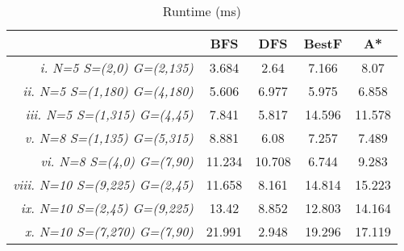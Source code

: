 \begin{table}[ht]
\centering
\begin{tabular}{r|c|c|c|c|}
\cline{2-5}
\multicolumn{1}{l|}{} & \textbf{BFS} & \textbf{DFS} & \textbf{BestF} & \textbf{A*} \\ \hline
\multicolumn{1}{|r|}{\textit{i. N=5 S=(2,0) G=(2,135)}} & 3.684 & 2.64 & 7.166 & 8.07 \\ \hline
\multicolumn{1}{|r|}{\textit{ii. N=5 S=(1,180) G=(4,180)}} & 5.606 & 6.977 & 5.975 & 6.858 \\ \hline
\multicolumn{1}{|r|}{\textit{iii. N=5 S=(1,315) G=(4,45)}} & 7.841 & 5.817 & 14.596 & 11.578 \\ \hline
\multicolumn{1}{|r|}{\textit{v. N=8 S=(1,135) G=(5,315)}} & 8.881 & 6.08 & 7.257 & 7.489 \\ \hline
\multicolumn{1}{|r|}{\textit{vi. N=8 S=(4,0) G=(7,90)}} & 11.234 & 10.708 & 6.744 & 9.283 \\ \hline
\multicolumn{1}{|r|}{\textit{viii. N=10 S=(9,225) G=(2,45)}} & 11.658 & 8.161 & 14.814 & 15.223 \\ \hline
\multicolumn{1}{|r|}{\textit{ix. N=10 S=(2,45) G=(9,225)}} & 13.42 & 8.852 & 12.803 & 14.164 \\ \hline
\multicolumn{1}{|r|}{\textit{x. N=10 S=(7,270) G=(7,90)}} & 21.991 & 2.948 & 19.296 & 17.119 \\ \hline
\end{tabular}
\caption{Runtime (ms)}
\label{tab:runtime}
\end{table}